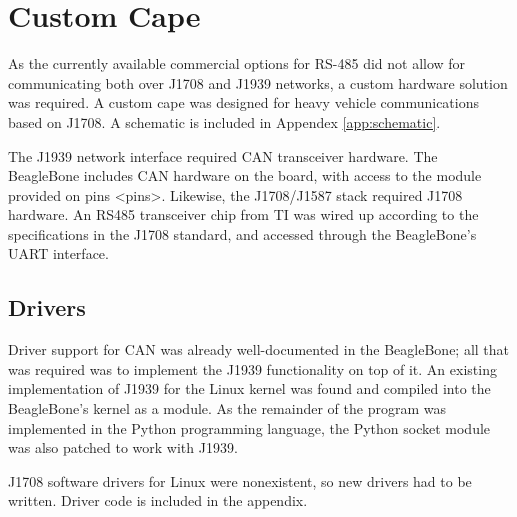 \section{Custom Cape}

As the currently available commercial options for RS-485 did not allow for communicating both over J1708 and J1939 networks, a custom
hardware solution was required. A custom cape was designed for heavy vehicle communications based on J1708\cite{J1708}. A schematic is included in 
Appendex \ref{app:schematic}.

The J1939 network interface required CAN transceiver hardware. The BeagleBone includes CAN hardware on the board, with access
to the module provided on pins <pins>. Likewise, the J1708/J1587 stack required J1708 hardware. An RS485 transceiver chip from TI
was wired up according to the specifications in the J1708 standard, and accessed through the BeagleBone's UART interface.

\subsection{Drivers}

Driver support for CAN was already well-documented in the BeagleBone; all that was required was to implement the J1939
functionality on top of it. An existing implementation of J1939 for the Linux kernel was found and compiled into
the BeagleBone's kernel as a module. As the remainder of the program was implemented in the Python programming language,
the Python socket module was also patched to work with J1939.

J1708 software drivers for Linux were nonexistent, so new drivers had to be written. Driver code is included in the
appendix.
